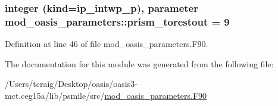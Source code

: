 \hypertarget{classmod__oasis__parameters_a9ed7a0f0a9392248de5b4b15849843df}{
\subsubsection[{prism\+\_\+torestout}]{\setlength{\rightskip}{0pt plus 5cm}integer (kind=ip\+\_\+intwp\+\_\+p), parameter mod\+\_\+oasis\+\_\+parameters\+::prism\+\_\+torestout = 9}}\label{classmod__oasis__parameters_a9ed7a0f0a9392248de5b4b15849843df}


Definition at line 46 of file mod\+\_\+oasis\+\_\+parameters.\+F90.



The documentation for this module was generated from the following file\+:\begin{DoxyCompactItemize}
\item 
/\+Users/tcraig/\+Desktop/oasis/oasis3-\/mct.\+ceg15a/lib/psmile/src/\hyperlink{mod__oasis__parameters_8_f90}{mod\+\_\+oasis\+\_\+parameters.\+F90}\end{DoxyCompactItemize}
